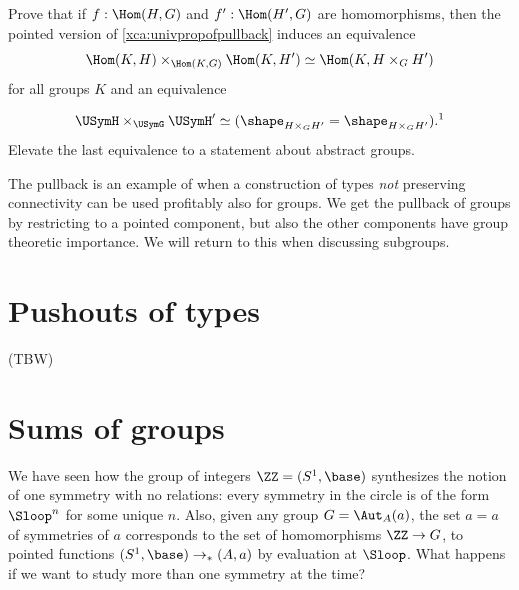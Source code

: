 
\begin{xca}
  Prove that if $f:\Hom(H,G)$ and $f':\Hom(H',G)$ are homomorphisms,
  then the pointed version of \cref{xca:univpropofpullback} induces an
  equivalence
  \[
    \Hom(K,H)\times_{\Hom(K,G)}\Hom(K,H')\simeq \Hom(K,H\times_GH')
  \]
  for all groups $K$ and an equivalence%
  \addtocounter{footnote}{-1}
  \[
    \USymH \times_{\USymG} \USymH'
    \simeq (\shape_{H\times_GH'}=\shape_{H\times_GH'}).\text{\footnotemark}
  \]
  Elevate the last equivalence to a statement about abstract groups.
\end{xca}

\begin{remark}
  The pullback is an example of when a construction of types \emph{not} preserving connectivity can be used profitably also for groups.
  We get the pullback of groups by restricting to a pointed component, but also the other components have group theoretic importance.
  We will return to this when discussing subgroups.
\end{remark}

\section{Pushouts of types}
\label{sec:pushouts}

(TBW)

\section{Sums of groups}
\label{sec:coprod}
We have seen how the group of integers $\ZZ=(S^1,\base)$ synthesizes the notion of one symmetry with no relations: every symmetry in the circle is of the form $\Sloop^n$ for some unique $n$.  Also, given any group $G=\Aut_A(a)$, the set $a=a$ of symmetries of $a$ corresponds to the set of homomorphisms $\ZZ\to G$, \ie to pointed functions $(S^1,\base)\to_*(A,a)$ by evaluation at $\Sloop$.  What happens if we want to study more than one symmetry at the time?

